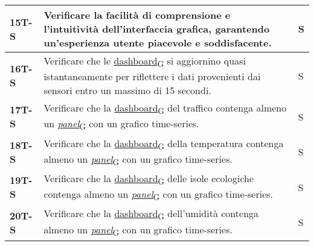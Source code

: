 \begin{longtable}{|>{\raggedright\arraybackslash}m{}|>{\raggedright\arraybackslash}m{}|>{\raggedright\arraybackslash}m{}|}
	\hline
	\textbf{15T-S}  & Verificare la facilità di comprensione e l'intuitività dell'interfaccia grafica, garantendo un'esperienza utente piacevole e soddisfacente.                                                                                                                                                                                                                                                              & S              \\
	\hline
	\textbf{16T-S}  & Verificare che le \href{https://7last.github.io/docs/pb/documentazione-interna/glossario\#dashboard}{dashboard\textsubscript{G}} si aggiornino quasi istantaneamente per riflettere i dati provenienti dai sensori entro un massimo di 15 secondi.                                                                                                                                                       & S              \\
	\hline
	\textbf{17T-S}  & Verificare che la \href{https://7last.github.io/docs/pb/documentazione-interna/glossario\#dashboard}{dashboard\textsubscript{G}} del traffico contenga almeno un \href{https://7last.github.io/docs/pb/documentazione-interna/glossario\#panel}{\textit{panel}\textsubscript{G}} con un grafico time-series.                                                                                             & S              \\
	\hline
	\textbf{18T-S}  & Verificare che la \href{https://7last.github.io/docs/pb/documentazione-interna/glossario\#dashboard}{dashboard\textsubscript{G}} della temperatura contenga almeno un \href{https://7last.github.io/docs/pb/documentazione-interna/glossario\#panel}{\textit{panel}\textsubscript{G}} con un grafico time-series.                                                                                        & S              \\
	\hline
	\textbf{19T-S}  & Verificare che la \href{https://7last.github.io/docs/pb/documentazione-interna/glossario\#dashboard}{dashboard\textsubscript{G}} delle isole ecologiche contenga almeno un \href{https://7last.github.io/docs/pb/documentazione-interna/glossario\#panel}{\textit{panel}\textsubscript{G}} con un grafico time-series.                                                                                   & S              \\
	\hline
	\textbf{20T-S}  & Verificare che la \href{https://7last.github.io/docs/pb/documentazione-interna/glossario\#dashboard}{dashboard\textsubscript{G}} dell'umidità contenga almeno un \href{https://7last.github.io/docs/pb/documentazione-interna/glossario\#panel}{\textit{panel}\textsubscript{G}} con un grafico time-series.                                                                                             & S              \\

\end{longtable}
